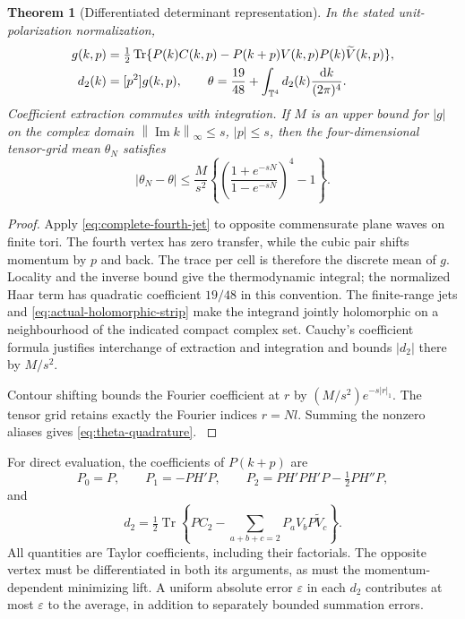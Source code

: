 \documentclass[11pt,oneside,openany]{book}
\newtheorem{theorem}{Theorem}[chapter]
\theoremstyle{definition}
\theoremstyle{remark}
\newcommand{\T}{\mathbb T}
\newcommand{\dd}{\mathrm d}
\newcommand{\Tr}{\operatorname{Tr}}
\newcommand{\norm}[1]{\left\lVert#1\right\rVert}
\newcommand{\src}[2]{\cite[#2]{#1}}
\begin{document}
\begin{theorem}[Differentiated determinant representation]
\label{thm:theta-integral}
In the stated unit-polarization normalization,
\begin{align}
 g(k,p)&=\tfrac12\Tr\{P(k)C(k,p)
       -P(k+p)V(k,p)P(k)\widetilde V(k,p)\},\notag\\
 d_2(k)&=[p^2]g(k,p),\qquad
 \theta=\frac{19}{48}
           +\int_{\T^4}d_2(k)\frac{\dd k}{(2\pi)^4}.
 \label{eq:actual-theta}
\end{align}
Coefficient extraction commutes with integration. If $M$ is an upper
bound for $|g|$ on the complex domain
$\norm{\operatorname{Im}k}_\infty\le s$, $|p|\le s$, then the
four-dimensional tensor-grid mean $\theta_N$ satisfies
\begin{equation}\label{eq:theta-quadrature}
 |\theta_N-\theta|\le\frac{M}{s^2}
 \left\{\left(\frac{1+e^{-sN}}{1-e^{-sN}}\right)^4-1\right\}.
\end{equation}
\end{theorem}
\begin{proof}
Apply \cref{eq:complete-fourth-jet} to opposite commensurate plane waves
on finite tori. The fourth vertex has zero transfer, while the cubic
pair shifts momentum by $p$ and back. The trace per cell is therefore
the discrete mean of $g$. Locality and the inverse bound give the
thermodynamic integral; the normalized Haar term has quadratic
coefficient $19/48$ in this convention. The finite-range jets and
\cref{eq:actual-holomorphic-strip} make the integrand jointly
holomorphic on a neighbourhood of the indicated compact complex set.
Cauchy's coefficient formula justifies interchange of extraction and
integration and bounds $|d_2|$ there by $M/s^2$.

Contour shifting bounds the Fourier coefficient at $r$ by
$(M/s^2)e^{-s|r|_1}$. The tensor grid retains exactly the Fourier
indices $r=Nl$. Summing the nonzero aliases gives
\cref{eq:theta-quadrature}. \src{F12}{V5}
\end{proof}
For direct evaluation, the coefficients of $P(k+p)$ are
\[
 P_0=P,\qquad P_1=-PH'P,\qquad
 P_2=PH'PH'P-\tfrac12PH''P,
\]
and
\[
 d_2=\tfrac12\Tr\left\{PC_2-
             \sum_{a+b+c=2}P_aV_bP\widetilde V_c\right\}.
\]
All quantities are Taylor coefficients, including their factorials.
The opposite vertex must be differentiated in both its arguments, as
must the momentum-dependent minimizing lift. A uniform absolute error
$\varepsilon$ in each $d_2$ contributes at most $\varepsilon$ to the
average, in addition to separately bounded summation errors.
\end{document}
